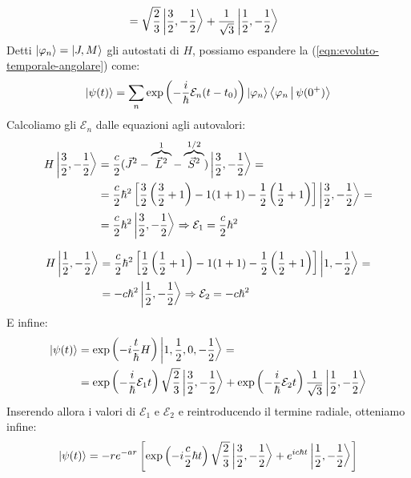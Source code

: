 \documentclass[../../FisicaTeorica.tex]{subfiles}
\begin{document}
\begin{enumerate}
\begin{align*}
&=\sqrt{\frac{2}{3}}\Ket{\frac{3}{2},-\frac{1}{2}} +\frac{1}{\sqrt{3}}\Ket{\frac{1}{2},-\frac{1}{2}}
\end{align*}
Detti $\Ket{\varphi_n} = \Ket{J,M}$ gli autostati di $H$, possiamo espandere la (\ref{eqn:evoluto-temporale-angolare}) come:
\begin{align*}
\Ket{\psi(t)} = \sum_n \exp\left(-\frac{i}{\hbar}\mathcal{E}_n(t-t_0) \right) \Ket{\varphi_n} \Braket{\varphi_n| \psi(0^+)}
\end{align*} 
Calcoliamo gli $\mathcal{E}_n$ dalle equazioni agli autovalori:
\begin{align*}
H\Ket{\frac{3}{2},-\frac{1}{2}}&=\frac{c}{2}(\vec{J}^2-\overbrace{\vec{L}^2}^{1}-\overbrace{\vec{S}^2}^{1/2})\Ket{\frac{3}{2},-\frac{1}{2}}=\\
&= \frac{c}{2}\hbar^2 \left[\frac{3}{2}\left(\frac{3}{2}+1\right)-1(1+1)-\frac{1}{2}\left(\frac{1}{2}+1\right)\right]\Ket{\frac{3}{2},-\frac{1}{2}}=\\
&=\frac{c}{2}\hbar^2\Ket{\frac{3}{2},-\frac{1}{2}} \Rightarrow  \mathcal{E}_1 =\frac{c}{2}\hbar^2
\end{align*}

\begin{align*}
H\Ket{\frac{1}{2},-\frac{1}{2}}&=\frac{c}{2}\hbar^2\left[\frac{1}{2}\left(\frac{1}{2}+1\right)-1(1+1)-\frac{1}{2}\left(\frac{1}{2}+1\right)\right]\Ket{1,-\frac{1}{2}}=\\
&=-c\hbar^2 \Ket{\frac{1}{2},-\frac{1}{2}} \Rightarrow \mathcal{E}_2=-c\hbar^2
\end{align*}
E infine:
\begin{align*}
\Ket{\psi(t)}&=\exp\left(-i\frac{t}{\hbar}H\right) \Ket{1,\frac{1}{2},0,-\frac{1}{2}} =\\
&= \exp\left(-\frac{i}{\hbar}\mathcal{E}_1 t\right)\sqrt{\frac{2}{3}}\Ket{\frac{3}{2},-\frac{1}{2}}+
\exp\left(-\frac{i}{\hbar}\mathcal{E}_2 t \right)\frac{1}{\sqrt{3}}\Ket{\frac{1}{2},-\frac{1}{2}}\\
\end{align*}
Inserendo allora i valori di $\mathcal{E}_1$ e $\mathcal{E}_2$ e reintroducendo il termine radiale, otteniamo infine:
\begin{align*}
\Ket{\psi(t)}=-r e^{-ar} \left[\exp\left(-i\frac{c}{2}\hbar t\right) \sqrt{\frac{2}{3}}\Ket{\frac{3}{2},-\frac{1}{2}}+e^{ic\hbar t}\Ket{\frac{1}{2},-\frac{1}{2}}\right]
\end{align*}
\end{enumerate}
\end{document}
